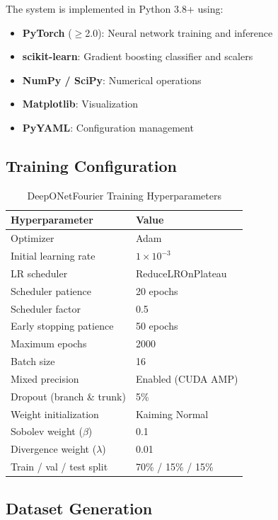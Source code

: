 \documentclass[conference]{IEEEtran}
\begin{document}
The system is implemented in Python 3.8+ using:
\begin{itemize}
    \item \textbf{PyTorch} ($\geq$2.0): Neural network training and inference
    \item \textbf{scikit-learn}: Gradient boosting classifier and scalers
    \item \textbf{NumPy / SciPy}: Numerical operations
    \item \textbf{Matplotlib}: Visualization
    \item \textbf{PyYAML}: Configuration management
\end{itemize}

\subsection{Training Configuration}

\begin{table}[htbp]
\caption{DeepONetFourier Training Hyperparameters}
\label{tab:training}
\centering
\begin{tabular}{ll}
\toprule
\textbf{Hyperparameter} & \textbf{Value} \\
\midrule
Optimizer & Adam \\
Initial learning rate & $1\times10^{-3}$ \\
LR scheduler & ReduceLROnPlateau \\
Scheduler patience & 20 epochs \\
Scheduler factor & 0.5 \\
Early stopping patience & 50 epochs \\
Maximum epochs & 2000 \\
Batch size & 16 \\
Mixed precision & Enabled (CUDA AMP) \\
Dropout (branch \& trunk) & 5\% \\
Weight initialization & Kaiming Normal \\
Sobolev weight ($\beta$) & 0.1 \\
Divergence weight ($\lambda$) & 0.01 \\
Train / val / test split & 70\% / 15\% / 15\% \\
\bottomrule
\end{tabular}
\end{table}

\subsection{Dataset Generation}
\end{document}
